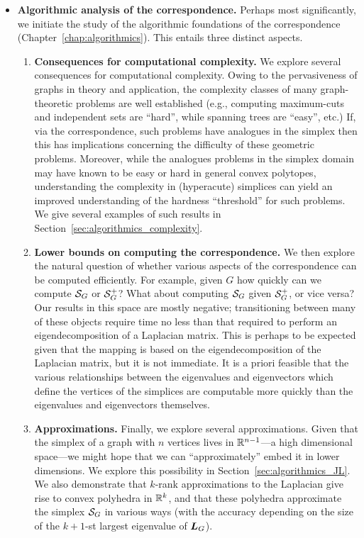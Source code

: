 \begin{itemize}
	\item {\bf Algorithmic analysis of the correspondence.} Perhaps most significantly, we initiate the study of the algorithmic foundations of the correspondence (Chapter~\ref{chap:algorithmics}). This entails three distinct aspects. 
	\begin{enumerate}
		\item {\bf Consequences for computational complexity.}	We explore several consequences for computational  complexity.  Owing to the pervasiveness of graphs in theory and application, the complexity classes of many graph-theoretic problems are  well established (e.g., computing maximum-cuts and independent sets are ``hard'', while spanning trees are ``easy'', etc.) If, via the correspondence, such problems have analogues in the simplex then this has implications concerning the difficulty of these geometric problems. Moreover, while the analogues problems in the simplex domain may have known to be easy or hard  in general convex polytopes, understanding the complexity in (hyperacute) simplices can yield an improved understanding of the hardness ``threshold'' for such problems. We give several examples of such results in Section~\ref{sec:algorithmics_complexity}. 
		\item {\bf Lower bounds on computing the correspondence.} We then explore the natural question of whether various aspects of the correspondence can be computed efficiently. For example, given $G$ how quickly can we compute $\mathcal{S}_G$ or $\mathcal{S}_G^+$? What about computing $\mathcal{S}_G$ given $\mathcal{S}_G^+$, or vice  versa? Our results in this  space are mostly negative; transitioning between many of these objects require time no less than that required to perform an eigendecomposition of a Laplacian matrix. 
		This is perhaps to be expected given that the mapping is based on the eigendecomposition of the Laplacian matrix, but it is not immediate.  It is a priori  feasible that the various relationships between the eigenvalues and eigenvectors which define the vertices of  the simplices are computable more quickly than the eigenvalues and eigenvectors  themselves. 
		\item {\bf Approximations.} Finally, we explore several approximations. Given that  the simplex of a graph with $n$ vertices lives in $\mathbb{R}^{n-1}$---a high dimensional  space---we might hope that we can ``approximately'' embed it  in  lower dimensions. We explore this possibility in Section~\ref{sec:algorithmics_JL}. We also demonstrate that $k$-rank approximations  to  the Laplacian give rise to convex polyhedra in $\mathbb{R}^k$, and that these polyhedra approximate the simplex $\mathcal{S}_G$ in various ways (with the accuracy depending on the  size of the $k+1$-st  largest  eigenvalue of $\vb*{L}_G$). 
	\end{enumerate}

\end{itemize}


